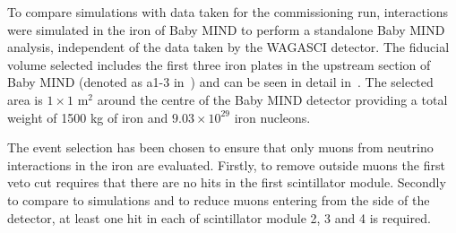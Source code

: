 
To compare simulations with data taken for the commissioning run, interactions were simulated in the iron of Baby MIND to perform a standalone Baby MIND analysis, independent of the data taken by the WAGASCI  detector. The fiducial volume selected includes the first three iron plates in the upstream section of Baby MIND (denoted as a1-3 in~) and can be seen in detail in~. The selected area is $1 \times 1$ m$^2$ around the centre of the Baby MIND detector providing a total weight of 1500 kg of iron and $9.03 \times 10^{29}$ iron nucleons.

The event selection has been chosen to ensure that only muons from neutrino interactions in the iron are evaluated. Firstly, to remove outside muons the first veto cut requires that there are no hits in the first scintillator module. Secondly to compare to simulations and to reduce muons entering from the side of the detector, at least one hit in each of scintillator module 2, 3 and 4 is required.



